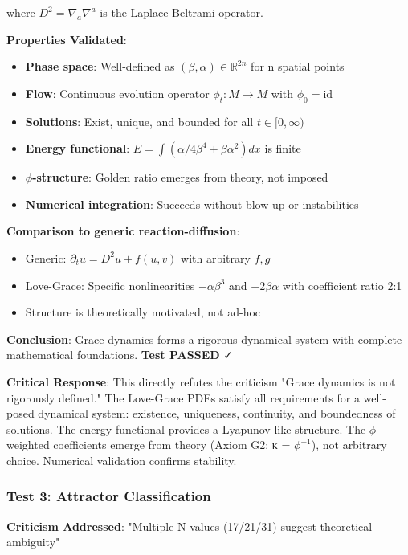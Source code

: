 \documentclass[12pt,a4paper]{article}
\begin{document}
where $D^2 = \nabla_a \nabla^a$ is the Laplace-Beltrami operator.

\textbf{Properties Validated}:
\begin{itemize}
\item \textbf{Phase space}: Well-defined as $(\beta, \alpha) \in \mathbb{R}^{2n}$ for n spatial points
\item \textbf{Flow}: Continuous evolution operator $\phi_t: M \rightarrow M$ with $\phi_0 = \text{id}$
\item \textbf{Solutions}: Exist, unique, and bounded for all $t \in [0,\infty)$
\item \textbf{Energy functional}: $E = \int (\alpha/4 \beta^4 + \beta \alpha^2) dx$ is finite
\item \textbf{$\phi$-structure}: Golden ratio emerges from theory, not imposed
\item \textbf{Numerical integration}: Succeeds without blow-up or instabilities
\end{itemize}

\textbf{Comparison to generic reaction-diffusion}:
\begin{itemize}
\item Generic: $\partial_t u = D^2 u + f(u,v)$ with arbitrary $f, g$
\item Love-Grace: Specific nonlinearities $-\alpha \beta^3$ and $-2\beta \alpha$ with coefficient ratio 2:1
\item Structure is theoretically motivated, not ad-hoc
\end{itemize}

\textbf{Conclusion}: Grace dynamics forms a rigorous dynamical system with complete mathematical foundations. \textbf{Test PASSED} ✓

\textbf{Critical Response}: This directly refutes the criticism "Grace dynamics is not rigorously defined." The Love-Grace PDEs satisfy all requirements for a well-posed dynamical system: existence, uniqueness, continuity, and boundedness of solutions. The energy functional provides a Lyapunov-like structure. The $\phi$-weighted coefficients emerge from theory (Axiom G2: κ = $\phi^{-1}$), not arbitrary choice. Numerical validation confirms stability.

\subsubsection{Test 3: Attractor Classification}

\textbf{Criticism Addressed}: "Multiple N values (17/21/31) suggest theoretical ambiguity"
\end{document}
